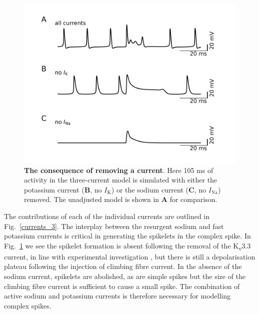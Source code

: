 \documentclass[twocolumn]{svjour3}          %
\renewcommand{\k}{\mathrm{K}}
\newcommand{\na}{\mathrm{Na}}
\begin{document}
\begin{figure}[!ht]
    \includegraphics[width=\linewidth]{figure_no_current.jpg}
  \caption{\textbf{The consequence of removing a current}. Here 105 ms
    of activity in the three-current model is simulated with either
    the potassium current (\textbf{B}, no $I_\k$) or the sodium
    current (\textbf{C}, no $I_\na$) removed. The unadjusted model is
    shown in \textbf{A} for comparison.}
\label{fig:no_current}
\end{figure}
  
The contributions of each of the individual currents are outlined in
Fig.~\ref{currents_3}.  The interplay between the resurgent sodium and
fast potassium currents is critical in generating the spikelets in the
complex spike. In Fig.~\ref{fig:no_current} we see the spikelet
formation is absent following the removal of the K\textsubscript{v}3.3
current, in line with experimental investigation
\citep{ZaghaEtAl2010}, but there is still a depolarisation plateau
following the injection of climbing fibre current. In the absence of
the sodium current, spikelets are abolished, as are simple spikes but
the size of the climbing fibre current is sufficient to cause a small
spike. The combination of active sodium and potassium currents is
therefore necessary for modelling complex spikes.
\end{document}
